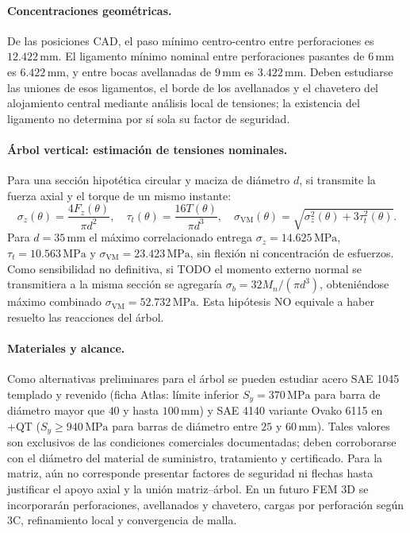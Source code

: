 \paragraph{Concentraciones geométricas.}
De las posiciones CAD, el paso mínimo centro-centro entre perforaciones es $12.422\,\mathrm{mm}$. El ligamento mínimo nominal entre perforaciones pasantes de $6\,\mathrm{mm}$ es $6.422\,\mathrm{mm}$, y entre bocas avellanadas de $9\,\mathrm{mm}$ es $3.422\,\mathrm{mm}$. Deben estudiarse las uniones de esos ligamentos, el borde de los avellanados y el chavetero del alojamiento central mediante análisis local de tensiones; la existencia del ligamento no determina por sí sola su factor de seguridad.

\paragraph{Árbol vertical: estimación de tensiones nominales.}
Para una sección hipotética circular y maciza de diámetro $d$, si transmite la fuerza axial y el torque de un mismo instante:
\begin{equation}
 \sigma_z(\theta)=\frac{4F_z(\theta)}{\pi d^2},\quad
 \tau_t(\theta)=\frac{16T(\theta)}{\pi d^3},\quad
 \sigma_{\mathrm{VM}}(\theta)=\sqrt{\sigma_z^2(\theta)+3\tau_t^2(\theta)}.
\end{equation}
Para $d=35\,\mathrm{mm}$ el máximo correlacionado entrega $\sigma_z=14.625\,\mathrm{MPa}$, $\tau_t=10.563\,\mathrm{MPa}$ y $\sigma_{\mathrm{VM}}=23.423\,\mathrm{MPa}$, sin flexión ni concentración de esfuerzos. Como sensibilidad no definitiva, si TODO el momento externo normal se transmitiera a la misma sección se agregaría $\sigma_b=32M_n/(\pi d^3)$, obteniéndose máximo combinado $\sigma_{\mathrm{VM}}=52.732\,\mathrm{MPa}$. Esta hipótesis NO equivale a haber resuelto las reacciones del árbol.

\paragraph{Materiales y alcance.}
Como alternativas preliminares para el árbol se pueden estudiar acero SAE 1045 templado y revenido (ficha Atlas: límite inferior $S_y=370\,\mathrm{MPa}$ para barra de diámetro mayor que $40$ y hasta $100\,\mathrm{mm}$) y SAE 4140 variante Ovako 6115 en +QT ($S_y\geq940\,\mathrm{MPa}$ para barras de diámetro entre $25$ y $60\,\mathrm{mm}$). Tales valores son exclusivos de las condiciones comerciales documentadas; deben corroborarse con el diámetro del material de suministro, tratamiento y certificado. Para la matriz, aún no corresponde presentar factores de seguridad ni flechas hasta justificar el apoyo axial y la unión matriz--árbol. En un futuro FEM 3D se incorporarán perforaciones, avellanados y chavetero, cargas por perforación según 3C, refinamiento local y convergencia de malla.

